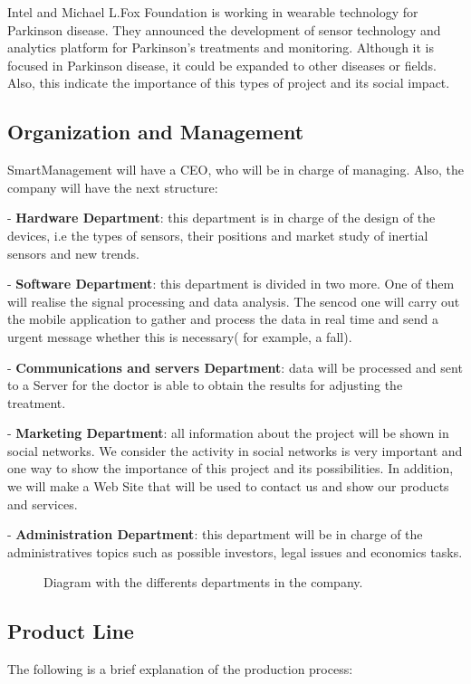  Intel and Michael L.Fox Foundation is working in wearable technology for Parkinson disease. They announced the development of sensor technology and analytics platform for Parkinson’s treatments and monitoring\cite{IntelAndMjf}. Although it is focused in Parkinson disease, it could be expanded to other diseases or fields. Also, this indicate the importance of this types of project and its social impact.


\subsection{Organization and Management}
SmartManagement will have a CEO, who will be  in charge of managing. Also, the company will have the next structure:

-	\textbf{Hardware Department}: this department is in charge of the design of the devices, i.e the types of sensors, their  positions  and market study of inertial sensors and new trends.

-	\textbf{Software Department}: this department is divided in two more. One of them will realise the signal processing and data analysis. The sencod one will carry out the mobile application to gather and process the data in real time and send a urgent message whether this is necessary( for example, a fall).

-	\textbf{Communications and servers Department}: data will be processed and sent to a Server for the doctor is able to obtain the results for adjusting the treatment.

-	\textbf{Marketing Department}: all information about the project will be shown in  social networks. We consider the activity in social networks is very important and one way to show the importance of this project and its possibilities.
In addition, we will make a Web Site that will be used to contact us and show our products and services.

-	\textbf{Administration Department}: this department will be in charge of the administratives topics such as possible investors, legal issues and economics tasks.

\begin{figure}[H]
	\centering
	\caption{Diagram with the differents departments in the company.}
	\label{fig:Deparments}
\end{figure}

\subsection{Product Line}
The following is a brief explanation of the production process:

